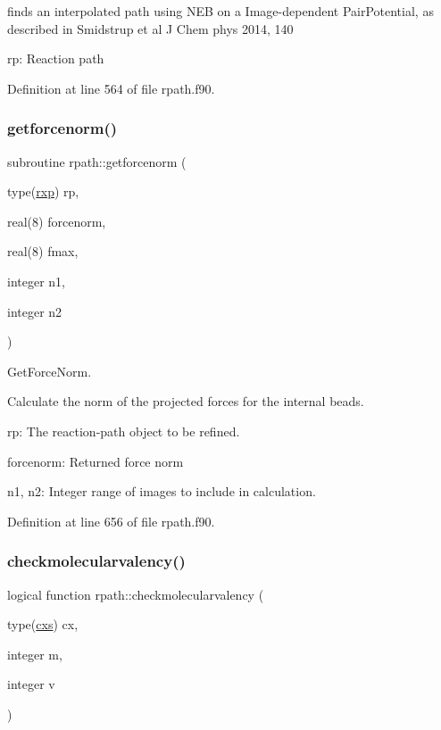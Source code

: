 finds an interpolated path using N\+EB on a Image-\/dependent Pair\+Potential, as described in Smidstrup et al J Chem phys 2014, 140


\begin{DoxyItemize}
\item rp\+: Reaction path 
\end{DoxyItemize}

Definition at line 564 of file rpath.\+f90.

\mbox{\label{namespacerpath_a691c70e4854e7529a7b85e69491cdccc}} 
\subsubsection{\texorpdfstring{getforcenorm()}{getforcenorm()}}
{\footnotesize\ttfamily subroutine rpath\+::getforcenorm (\begin{DoxyParamCaption}\item[{type(\mbox{\hyperlink{structrpath_1_1rxp}{rxp}})}]{rp,  }\item[{real(8)}]{forcenorm,  }\item[{real(8)}]{fmax,  }\item[{integer}]{n1,  }\item[{integer}]{n2 }\end{DoxyParamCaption})}



Get\+Force\+Norm. 

Calculate the norm of the projected forces for the internal beads.


\begin{DoxyItemize}
\item rp\+: The reaction-\/path object to be refined.
\item forcenorm\+: Returned force norm
\item n1, n2\+: Integer range of images to include in calculation. 
\end{DoxyItemize}

Definition at line 656 of file rpath.\+f90.

\mbox{\label{namespacerpath_a5c4298880a886889f8edc93c7735c5b1}} 
\subsubsection{\texorpdfstring{checkmolecularvalency()}{checkmolecularvalency()}}
{\footnotesize\ttfamily logical function rpath\+::checkmolecularvalency (\begin{DoxyParamCaption}\item[{type(\mbox{\hyperlink{structchemstr_1_1cxs}{cxs}})}]{cx,  }\item[{integer}]{m,  }\item[{integer}]{v }\end{DoxyParamCaption})}



